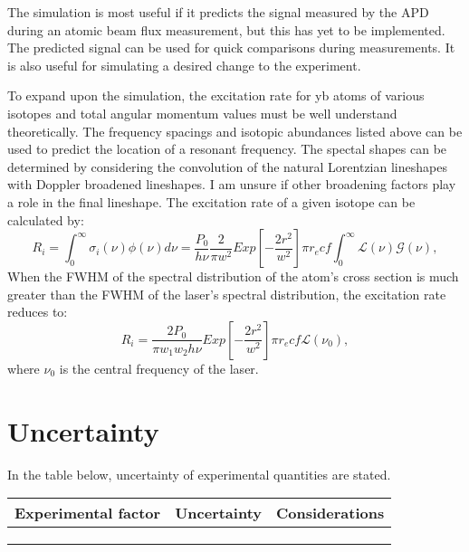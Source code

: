 \documentclass[12pt, a4paper]{article}
\begin{document}
The simulation is most useful if it predicts the signal measured by the APD during an atomic beam flux measurement, but this has yet to be implemented. The predicted signal can be used for quick comparisons during measurements. It is also useful for simulating a desired change to the experiment. 

To expand upon the simulation, the excitation rate for yb atoms of various isotopes and total angular momentum values must be well understand theoretically. The frequency spacings and isotopic abundances listed above can be used to predict the location of a resonant frequency. The spectal shapes can be determined by considering the convolution of the natural Lorentzian lineshapes with Doppler broadened lineshapes. I am unsure if other broadening factors play a role in the final lineshape. The excitation rate of a given isotope can be calculated by:
\begin{equation}
R_i = \int_{0}^{\infty}\sigma_i(\nu) \phi(\nu)d\nu = \frac{P_0}{h \nu} \frac{2}{\pi w^2} Exp[-\frac{2r^2}{w^2}]\pi r_e c f \int_{0}^{\infty} \mathscr{L}(\nu) \mathscr{G}(\nu),
\end{equation}
When the FWHM of the spectral distribution of the atom's cross section is much greater than the FWHM of the laser's spectral distribution, the excitation rate reduces to:
\begin{equation}
R_i =\frac{2P_0}{\pi w_1 w_2 h \nu} Exp[-\frac{2r^2}{w^2}] \pi r_e c f \mathscr{L} (\nu_0),
\end{equation}
where $\nu_0$ is the central frequency of the laser.



\section{Uncertainty}
In the table below, uncertainty of experimental quantities are stated.
\begin{center}
\begin{tabular}{||c|c|c||}
\hline
Experimental factor & Uncertainty & Considerations\\
\hline\hline
 &  & \\
\hline
 &  & \\
\hline
 &  &  \\
\hline 
\end{tabular}
\end{center}
\nocite{*}
{}

\end{document}
